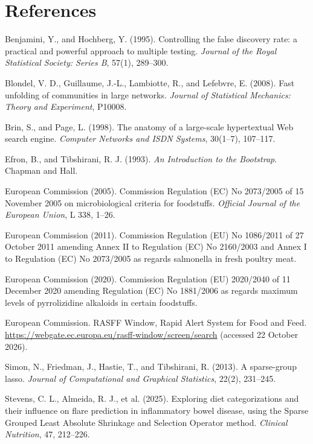 \documentclass[11pt]{article}
\begin{document}
\section*{References}
\small
\begin{list}{}{\setlength{\leftmargin}{1.5em}\setlength{\itemindent}{-1.5em}\setlength{\itemsep}{0.2em}}
\item Benjamini, Y., and Hochberg, Y. (1995). Controlling the false discovery rate: a practical and powerful approach to multiple testing. \emph{Journal of the Royal Statistical Society: Series B}, 57(1), 289–300.
\item Blondel, V. D., Guillaume, J.-L., Lambiotte, R., and Lefebvre, E. (2008). Fast unfolding of communities in large networks. \emph{Journal of Statistical Mechanics: Theory and Experiment}, P10008.
\item Brin, S., and Page, L. (1998). The anatomy of a large-scale hypertextual Web search engine. \emph{Computer Networks and ISDN Systems}, 30(1–7), 107–117.
\item Efron, B., and Tibshirani, R. J. (1993). \emph{An Introduction to the Bootstrap}. Chapman and Hall.
\item European Commission (2005). Commission Regulation (EC) No 2073/2005 of 15 November 2005 on microbiological criteria for foodstuffs. \emph{Official Journal of the European Union}, L 338, 1–26.
\item European Commission (2011). Commission Regulation (EU) No 1086/2011 of 27 October 2011 amending Annex II to Regulation (EC) No 2160/2003 and Annex I to Regulation (EC) No 2073/2005 as regards salmonella in fresh poultry meat.
\item European Commission (2020). Commission Regulation (EU) 2020/2040 of 11 December 2020 amending Regulation (EC) No 1881/2006 as regards maximum levels of pyrrolizidine alkaloids in certain foodstuffs.
\item European Commission. RASFF Window, Rapid Alert System for Food and Feed. \url{https://webgate.ec.europa.eu/rasff-window/screen/search} (accessed 22 October 2026).
\item Simon, N., Friedman, J., Hastie, T., and Tibshirani, R. (2013). A sparse-group lasso. \emph{Journal of Computational and Graphical Statistics}, 22(2), 231–245.
\item Stevens, C. L., Almeida, R. J., et al. (2025). Exploring diet categorizations and their influence on flare prediction in inflammatory bowel disease, using the Sparse Grouped Least Absolute Shrinkage and Selection Operator method. \emph{Clinical Nutrition}, 47, 212–226.
\end{list}
\end{document}
